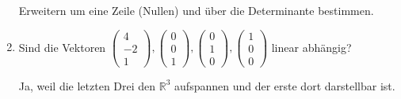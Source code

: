 \documentclass[12pt,a4paper]{scrreprt}
\newcommand{\R}{\mathds{R}}
\begin{document}
\begin{enumerate}
	Erweitern um eine Zeile (Nullen) und über die Determinante bestimmen.

	\item Sind die Vektoren $\begin{pmatrix}
		4 \\ -2 \\ 1
	\end{pmatrix}, \begin{pmatrix}
		0 \\ 0 \\ 1
	\end{pmatrix}, \begin{pmatrix}
		0 \\ 1 \\ 0
	\end{pmatrix}, \begin{pmatrix}
		1 \\ 0 \\ 0
	\end{pmatrix}$
	linear abhängig?

	Ja, weil die letzten Drei den $\R^3$ aufspannen und der erste dort darstellbar ist.
\end{enumerate}
\end{document}

